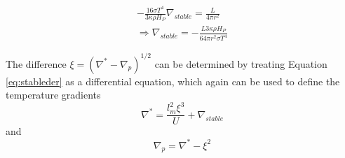 \documentclass[10pt, nofootinbib, twocolumn]{revtex4-1}
\begin{document}
\begin{equation}
\begin{split}
    -\frac{16\sigma T^4}{3\kappa \rho H_P}\nabla_{stable} =\frac{L}{4\pi r^2} \\ \Rightarrow \nabla_{stable} = -\frac{L3\kappa \rho H_P}{64\pi r^2\sigma T^4}
\end{split}
\end{equation}


The difference $\xi = (\nabla^*-\nabla_p)^{1/2} $ can be determined by treating Equation \eqref{eq:stableder} as a differential equation, which again can be used to define the temperature gradients 
\begin{equation}
    \nabla^*=\frac{l_m^2\xi^3}{U} + \nabla_{stable}
\end{equation}
and 
\begin{equation}
    \nabla_p = \nabla^*-\xi^2
\end{equation}
\end{document}
